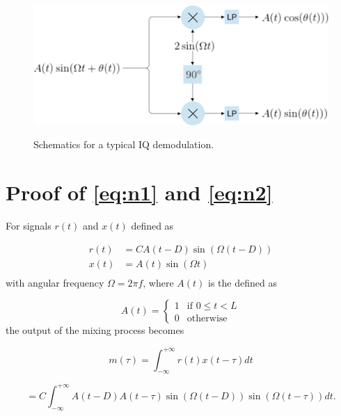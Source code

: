 \begin{appendices}
\begin{figure}
	\centering
	\hbox{\hspace{-0.5em} \includegraphics[scale=0.60]{figs_temp/iq_demod.jpg}}
	\caption{Schematics for a typical IQ demodulation.}
	\label{fig:iq_demod}
\end{figure}

\chapter{Proof of \ref{eq:n1} and \ref{eq:n2}}

For signals $r(t)$ and $x(t)$ defined as

\begin{equation}
	\begin{split}
		r(t) &= CA(t - D)\sin(\Omega(t - D)) \\
		x(t) &= A(t)\sin(\Omega t) \\
	\end{split}
\end{equation}
with angular frequency $\Omega = 2\pi f$, where $A(t)$ is the defined as 

\begin{equation}
	A(t) = \begin{cases}
		1 & \text{if $0 \leq t < L$} \\
		0 & \text{otherwise}
	\end{cases}
\end{equation}
the output of the mixing process becomes

\begin{equation}
	m(\tau) 
	= \int_{-\infty}^{+\infty}r(t)x(t-\tau)dt
\end{equation}

\begin{equation}	
	= C \int_{-\infty}^{+\infty}A(t-D)A(t-\tau)\sin(\Omega(t-D))\sin(\Omega(t-\tau))dt.
\end{equation}


\end{appendices}
